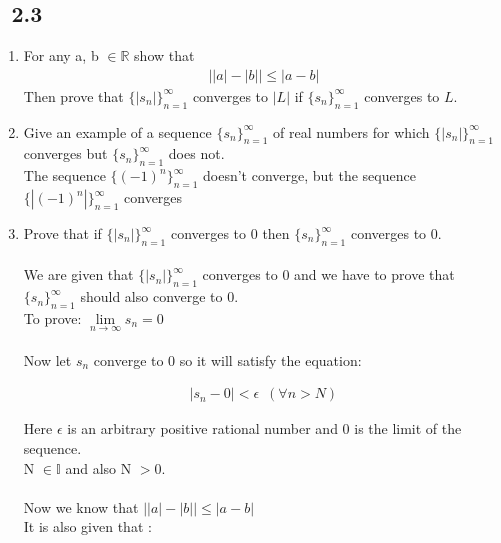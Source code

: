 \documentclass[11pt, letterpaper]{article}
\begin{document}
\subsection{\exr \, 2.3}
\begin{enumerate}
\item{For any a, b $\in \mathbb{R}$ show that\\
	\begin{align*}
		\left| \left|a \right| - \left| b \right|\right| \leq \left| a - b\right|
	\end{align*}
	Then prove that $\lbrace \left|s_n\right| \rbrace_{n=1}^\infty$ converges to $\left| L \right|$ if $\lbrace s_n \rbrace_{n=1}^\infty$ converges to $ L$.
}

\item{Give an example of a sequence $\lbrace s_n \rbrace_{n=1}^\infty$ of real numbers for which $\lbrace \left| s_n \right| \rbrace_{n=1}^\infty$ converges but $\lbrace s_n \rbrace_{n=1}^\infty$ does not.\\
	The sequence $ \lbrace (-1)^n \rbrace_{n=1}^\infty $ doesn't converge, but the sequence $ \lbrace \left| (-1)^n \right| \rbrace_{n=1}^\infty $ converges
}

\item{Prove that if $\lbrace \left| s_n \right|\rbrace_{n=1}^\infty$ converges to 0 then $\lbrace s_n \rbrace_{n=1}^\infty$ converges to 0.\\\\
	We are given that $ \lbrace \left| s_n \right| \rbrace_{n=1}^\infty $ converges to 0 and we have to prove that $ \lbrace s_n \rbrace_{n=1}^\infty $ should also converge to 0.\\
	To prove: $\lim \limits_{n \to \infty} s_n = 0$\\\\
	Now let $s_n$ converge to 0 so it will satisfy the equation:
	
	\setcounter{equation}{0}
	
	\begin{eqnarray}
		\left| s_n - 0 \right| < \epsilon \,\,\, (\forall n > N)
	\end{eqnarray}
	
	Here $\epsilon$ is an arbitrary positive rational number and 0 is the limit of the sequence.\\
	N $\in \mathbb{I}$ and also N $> 0$.\\\\
	Now we know that $\left| \left| a \right| - \left| b \right| \right| \leq \left| a - b \right| $\\
	It is also given that :
	
}
\end{enumerate}
\end{document}
